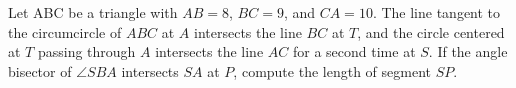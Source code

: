 Let ABC be a triangle with $AB = 8$, $BC = 9$, and $CA = 10$. The line tangent to the circumcircle of $ABC$ at $A$ intersects the line $BC$ at $T$, and the circle centered at $T$ passing through $A$ intersects the line $AC$ for a second time at $S$. If the angle bisector of $\angle SBA$ intersects $SA$ at $P$, compute the length of segment $SP$.